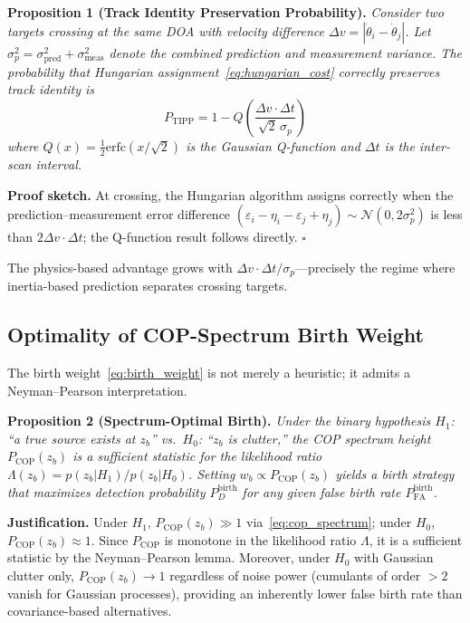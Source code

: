 \documentclass[journal]{IEEEtran}
\begin{document}
\textbf{Proposition 1 (Track Identity Preservation Probability).}
\emph{Consider two targets crossing at the same DOA with velocity difference $\Delta v = |\dot{\theta}_i - \dot{\theta}_j|$. Let $\sigma_p^2 = \sigma_{\mathrm{pred}}^2 + \sigma_{\mathrm{meas}}^2$ denote the combined prediction and measurement variance. The probability that Hungarian assignment~\eqref{eq:hungarian_cost} correctly preserves track identity is}
\begin{equation}
P_{\mathrm{TIPP}} = 1 - Q\!\left(\frac{\Delta v \cdot \Delta t}{\sqrt{2}\,\sigma_p}\right)
\label{eq:tipp}
\end{equation}
\emph{where $Q(x) = \frac{1}{2}\mathrm{erfc}(x/\sqrt{2})$ is the Gaussian Q-function and $\Delta t$ is the inter-scan interval.}

\textbf{Proof sketch.}
At crossing, the Hungarian algorithm assigns correctly when the prediction--measurement error difference $(\varepsilon_i - \eta_i - \varepsilon_j + \eta_j) \sim \mathcal{N}(0, 2\sigma_p^2)$ is less than $2\Delta v \cdot \Delta t$; the Q-function result follows directly. \hfill$\square$

The physics-based advantage grows with $\Delta v \cdot \Delta t / \sigma_p$---precisely the regime where inertia-based prediction separates crossing targets.

\subsection{Optimality of COP-Spectrum Birth Weight}
\label{sec:birth_theory}

The birth weight~\eqref{eq:birth_weight} is not merely a heuristic; it admits a Neyman--Pearson interpretation.

\textbf{Proposition 2 (Spectrum-Optimal Birth).}
\emph{Under the binary hypothesis $H_1$: ``a true source exists at $z_b$'' vs.~$H_0$: ``$z_b$ is clutter,'' the COP spectrum height $P_{\mathrm{COP}}(z_b)$ is a sufficient statistic for the likelihood ratio $\Lambda(z_b) = p(z_b | H_1) / p(z_b | H_0)$. Setting $w_b \propto P_{\mathrm{COP}}(z_b)$ yields a birth strategy that maximizes detection probability $P_D^{\mathrm{birth}}$ for any given false birth rate $P_{\mathrm{FA}}^{\mathrm{birth}}$.}

\textbf{Justification.}
Under $H_1$, $P_{\mathrm{COP}}(z_b) \gg 1$ via~\eqref{eq:cop_spectrum}; under $H_0$, $P_{\mathrm{COP}}(z_b) \approx 1$. Since $P_{\mathrm{COP}}$ is monotone in the likelihood ratio $\Lambda$, it is a sufficient statistic by the Neyman--Pearson lemma. Moreover, under $H_0$ with Gaussian clutter only, $P_{\mathrm{COP}}(z_b) \to 1$ regardless of noise power (cumulants of order $> 2$ vanish for Gaussian processes), providing an inherently lower false birth rate than covariance-based alternatives.
\end{document}
